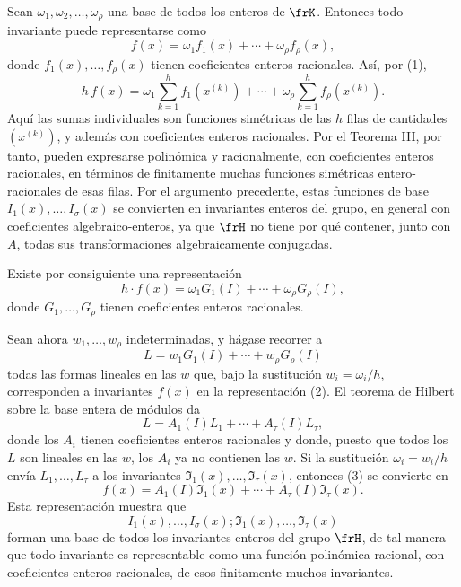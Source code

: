 \documentclass[11pt]{article}
\begin{document}
Sean \(\omega_1,\omega_2,\ldots,\omega_\rho\) una base de todos los enteros de \(\frK\). Entonces todo invariante puede representarse como
\[
        f(x)=\omega_1 f_1(x)+\cdots+\omega_\rho f_\rho(x),
\]
donde \(f_1(x),\ldots,f_\rho(x)\) tienen coeficientes enteros racionales. Así, por (1),
\[
        h\,f(x)
        =
        \omega_1\sum_{k=1}^{h}f_1(x^{(k)})
        +\cdots+
        \omega_\rho\sum_{k=1}^{h}f_\rho(x^{(k)}).
\]
Aquí las sumas individuales son funciones simétricas de las \(h\) filas de cantidades \((x^{(k)})\), y además con coeficientes enteros racionales. Por el Teorema III, por tanto, pueden expresarse polinómica y racionalmente, con coeficientes enteros racionales, en términos de finitamente muchas funciones simétricas entero-racionales de esas filas. Por el argumento precedente, estas funciones de base \(I_1(x),\ldots,I_\sigma(x)\) se convierten en invariantes enteros del grupo, en general con coeficientes algebraico-enteros, ya que \(\frH\) no tiene por qué contener, junto con \(A\), todas sus transformaciones algebraicamente conjugadas.

Existe por consiguiente una representación
\begin{equation}
        h\cdot f(x)=\omega_1G_1(I)+\cdots+\omega_\rho G_\rho(I),
\end{equation}
donde \(G_1,\ldots,G_\rho\) tienen coeficientes enteros racionales.

Sean ahora \(w_1,\ldots,w_\rho\) indeterminadas, y hágase recorrer a
\[
        L=w_1G_1(I)+\cdots+w_\rho G_\rho(I)
\]
todas las formas lineales en las \(w\) que, bajo la sustitución \(w_i=\omega_i/h\), corresponden a invariantes \(f(x)\) en la representación (2). El teorema de Hilbert sobre la base entera de módulos da
\begin{equation}
        L=A_1(I)L_1+\cdots+A_\tau(I)L_\tau,
\end{equation}
donde los \(A_i\) tienen coeficientes enteros racionales y donde, puesto que todos los \(L\) son lineales en las \(w\), los \(A_i\) ya no contienen las \(w\). Si la sustitución \(\omega_i=w_i/h\) envía \(L_1,\ldots,L_\tau\) a los invariantes \(\mathfrak I_1(x),\ldots,\mathfrak I_\tau(x)\), entonces (3) se convierte en
\begin{equation}
        f(x)=A_1(I)\mathfrak I_1(x)+\cdots+A_\tau(I)\mathfrak I_\tau(x).
\end{equation}
Esta representación muestra que
\[
        I_1(x),\ldots,I_\sigma(x);\mathfrak I_1(x),\ldots,\mathfrak I_\tau(x)
\]
forman una base de todos los invariantes enteros del grupo \(\frH\), de tal manera que todo invariante es representable como una función polinómica racional, con coeficientes enteros racionales, de esos finitamente muchos invariantes.
\end{document}

